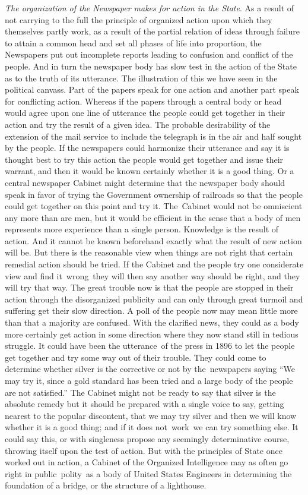 \documentclass[openany,nobib]{tufte-book}
\begin{document}
\emph{The organization of the Newspaper makes for action in the State}.
As a result of not carrying to the full the principle of organized
action upon which they themselves partly work, as a result of the
partial relation of ideas through failure to attain a common head and
set all phases of life into proportion, the Newspapers put out
incomplete reports leading to confusion and conflict of the people. And
in turn the newspaper body has slow test in the action of the State as
to the truth of its utterance. The illustration of this we have seen in
the political canvass. Part of the papers speak for one action and
another part speak for conflicting action. Whereas if the papers through
a central body or head would agree upon one line of utterance the people
could get together in their action and try the result of a given idea.
The probable desirability of the extension of the mail service to
include the telegraph is in the air and half sought by the people. If
the newspapers could harmonize their utterance and say it is thought
best to try this action the people would get together and issue their
warrant, and then it would be known certainly whether it is a good
thing. Or a central newspaper Cabinet might determine that the newspaper
body should speak in favor of trying the Government ownership of
railroads so that the people could get together on this point and try
it. The~Cabinet would not be omniscient any more than are men, but it
would be efficient in the sense that a body of men represents more
experience than a single person. Knowledge is the result of action. And
it cannot be known beforehand exactly what the result of new action will
be. But there is the reasonable view when things are not right that
certain remedial action should be tried. If the Cabinet and the people
try one considerate view and find it~wrong~they will then say another
way should be right, and they will try that way. The great trouble now
is that the people are stopped in their action through the disorganized
publicity and can only through great turmoil and suffering get their
slow direction. A poll of the people now may mean little more than that
a majority are confused. With the clarified news, they could as a body
more certainly get action in some direction where they now stand still
in tedious struggle. It could have been the utterance~of the press in
1896 to let the people get together and try some way out of their
trouble. They could come to determine whether silver is the corrective
or not by the~newspapers saying ``We may try it, since a gold standard
has been tried and a large body of the people are not satisfied.'' The
Cabinet might not be ready to say that silver is the absolute remedy but
it should be prepared with a single voice to say, getting nearest to the
popular discontent, that we may try silver and then we will know whether
it is a good thing; and if it does not~work~we can try something else.
It could say this, or with singleness propose any seemingly
determinative course, throwing itself upon the test of action. But with
the principles of State once worked out in action, a Cabinet of the
Organized Intelligence may as often go right in public~polity~as a body
of United States Engineers in determining the foundation of a bridge, or
the structure of a lighthouse.~
\end{document}
